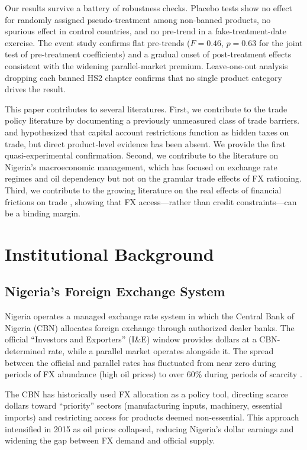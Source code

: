 \documentclass[12pt]{article}
\begin{document}
Our results survive a battery of robustness checks. Placebo tests show no effect for randomly assigned pseudo-treatment among non-banned products, no spurious effect in control countries, and no pre-trend in a fake-treatment-date exercise. The event study confirms flat pre-trends ($F = 0.46$, $p = 0.63$ for the joint test of pre-treatment coefficients) and a gradual onset of post-treatment effects consistent with the widening parallel-market premium. Leave-one-out analysis dropping each banned HS2 chapter confirms that no single product category drives the result.

This paper contributes to several literatures. First, we contribute to the trade policy literature by documenting a previously unmeasured class of trade barriers. \citet{wei_1999} and \citet{wei_zhang_2007} hypothesized that capital account restrictions function as hidden taxes on trade, but direct product-level evidence has been absent. We provide the first quasi-experimental confirmation. Second, we contribute to the literature on Nigeria's macroeconomic management, which has focused on exchange rate regimes and oil dependency \citep{adebiyi_2007} but not on the granular trade effects of FX rationing. Third, we contribute to the growing literature on the real effects of financial frictions on trade \citep{manova_2013, amiti_weinstein_2011}, showing that FX access---rather than credit constraints---can be a binding margin.

\section{Institutional Background}

\subsection{Nigeria's Foreign Exchange System}

Nigeria operates a managed exchange rate system in which the Central Bank of Nigeria (CBN) allocates foreign exchange through authorized dealer banks. The official ``Investors and Exporters'' (I\&E) window provides dollars at a CBN-determined rate, while a parallel market operates alongside it. The spread between the official and parallel rates has fluctuated from near zero during periods of FX abundance (high oil prices) to over 60\% during periods of scarcity \citep{adebiyi_2007}.

The CBN has historically used FX allocation as a policy tool, directing scarce dollars toward ``priority'' sectors (manufacturing inputs, machinery, essential imports) and restricting access for products deemed non-essential. This approach intensified in 2015 as oil prices collapsed, reducing Nigeria's dollar earnings and widening the gap between FX demand and official supply.
\end{document}
